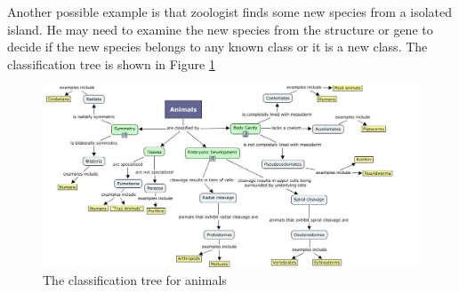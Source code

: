 Another possible example is that zoologist finds some new species from a isolated island. He may need to examine the new species from the structure or gene to decide if the new species belongs to any known class or it is a new class. The classification tree is shown in Figure \ref{Fig:app2}
\begin{figure}[h!]
    \centering
    \includegraphics[width=400pt]{../images/app2.jpg}
    \caption{The classification tree for animals\cite{newyork}}
    \label{Fig:app2}
	\end{figure}


